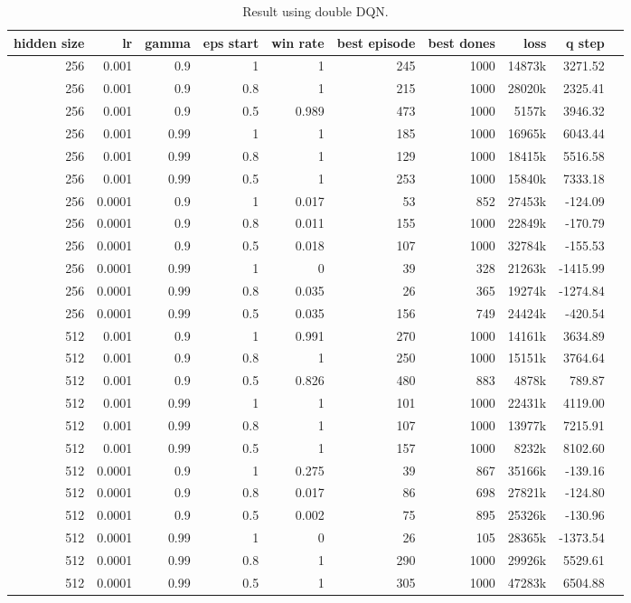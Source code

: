 \begin{table}[h]
	\centering
	\scriptsize
	\begin{tabular}{r r r r | r r r r r r}
		\toprule
			hidden size & lr & gamma & eps start & win rate & best episode & best dones & loss & q step \\
		\midrule
			256 & 0.001 & 0.9 & 1 & 1 & 245 & 1000 & 14873k & 3271.52 \\
			256 & 0.001 & 0.9 & 0.8 & 1 & 215 & 1000 & 28020k & 2325.41 \\
			256 & 0.001 & 0.9 & 0.5 & 0.989 & 473 & 1000 & 5157k & 3946.32 \\
			256 & 0.001 & 0.99 & 1 & 1 & 185 & 1000 & 16965k & 6043.44 \\
			256 & 0.001 & 0.99 & 0.8 & 1 & 129 & 1000 & 18415k & 5516.58 \\
			256 & 0.001 & 0.99 & 0.5 & 1 & 253 & 1000 & 15840k & 7333.18 \\
			256 & 0.0001 & 0.9 & 1 & 0.017 & 53 & 852 & 27453k & -124.09 \\
			256 & 0.0001 & 0.9 & 0.8 & 0.011 & 155 & 1000 & 22849k & -170.79 \\
			256 & 0.0001 & 0.9 & 0.5 & 0.018 & 107 & 1000 & 32784k & -155.53 \\
			256 & 0.0001 & 0.99 & 1 & 0 & 39 & 328 & 21263k & -1415.99 \\
			256 & 0.0001 & 0.99 & 0.8 & 0.035 & 26 & 365 & 19274k & -1274.84 \\
			256 & 0.0001 & 0.99 & 0.5 & 0.035 & 156 & 749 & 24424k & -420.54 \\
			512 & 0.001 & 0.9 & 1 & 0.991 & 270 & 1000 & 14161k & 3634.89 \\
			512 & 0.001 & 0.9 & 0.8 & 1 & 250 & 1000 & 15151k & 3764.64 \\
			512 & 0.001 & 0.9 & 0.5 & 0.826 & 480 & 883 & 4878k & 789.87 \\
			512 & 0.001 & 0.99 & 1 & 1 & 101 & 1000 & 22431k & 4119.00 \\
			512 & 0.001 & 0.99 & 0.8 & 1 & 107 & 1000 & 13977k & 7215.91 \\
			512 & 0.001 & 0.99 & 0.5 & 1 & 157 & 1000 & 8232k & 8102.60 \\
			512 & 0.0001 & 0.9 & 1 & 0.275 & 39 & 867 & 35166k & -139.16 \\
			512 & 0.0001 & 0.9 & 0.8 & 0.017 & 86 & 698 & 27821k & -124.80 \\
			512 & 0.0001 & 0.9 & 0.5 & 0.002 & 75 & 895 & 25326k & -130.96 \\
			512 & 0.0001 & 0.99 & 1 & 0 & 26 & 105 & 28365k & -1373.54 \\
			512 & 0.0001 & 0.99 & 0.8 & 1 & 290 & 1000 & 29926k & 5529.61 \\
			512 & 0.0001 & 0.99 & 0.5 & 1 & 305 & 1000 & 47283k & 6504.88 \\
		\bottomrule
	\end{tabular}
	\caption{Result using double DQN.}
	\label{ddqn_results}
\end{table}
